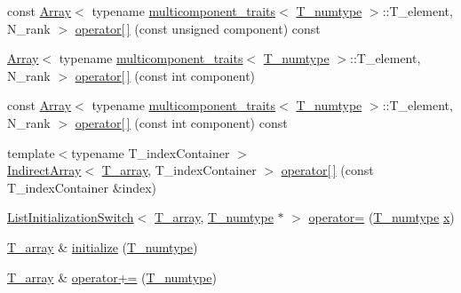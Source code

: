 \begin{DoxyCompactItemize}
\item 
const \hyperlink{classArray}{Array}$<$ typename \hyperlink{structmulticomponent__traits}{multicomponent\+\_\+traits}$<$ \hyperlink{classArray_ae72770f4a1d2f8b7193badafc320f008}{T\+\_\+numtype} $>$\+::T\+\_\+element, N\+\_\+rank $>$ \hyperlink{classArray_abddb0f84b164572b832a72fefcb7c6a3}{operator\mbox{[}$\,$\mbox{]}} (const unsigned component) const 
\item 
\hyperlink{classArray}{Array}$<$ typename \hyperlink{structmulticomponent__traits}{multicomponent\+\_\+traits}$<$ \hyperlink{classArray_ae72770f4a1d2f8b7193badafc320f008}{T\+\_\+numtype} $>$\+::T\+\_\+element, N\+\_\+rank $>$ \hyperlink{classArray_acca3c1802edac60f8482419c9902d28f}{operator\mbox{[}$\,$\mbox{]}} (const int component)
\item 
const \hyperlink{classArray}{Array}$<$ typename \hyperlink{structmulticomponent__traits}{multicomponent\+\_\+traits}$<$ \hyperlink{classArray_ae72770f4a1d2f8b7193badafc320f008}{T\+\_\+numtype} $>$\+::T\+\_\+element, N\+\_\+rank $>$ \hyperlink{classArray_a6deb6b01a7a7ac0ef1b5d4f63368354b}{operator\mbox{[}$\,$\mbox{]}} (const int component) const 
\item 
{\footnotesize template$<$typename T\+\_\+index\+Container $>$ }\\\hyperlink{classIndirectArray}{Indirect\+Array}$<$ \hyperlink{classArray_a6a3d9b6a214107a10df219091801f1e0}{T\+\_\+array}, T\+\_\+index\+Container $>$ \hyperlink{classArray_ae97dbb0539c62745cb96ba2c3476cc69}{operator\mbox{[}$\,$\mbox{]}} (const T\+\_\+index\+Container \&index)
\item 
\hyperlink{classListInitializationSwitch}{List\+Initialization\+Switch}$<$ \hyperlink{classArray_a6a3d9b6a214107a10df219091801f1e0}{T\+\_\+array}, \hyperlink{classArray_ae72770f4a1d2f8b7193badafc320f008}{T\+\_\+numtype} $\ast$ $>$ \hyperlink{classArray_ae856960044c0f8c560afbb03c9f9dbb8}{operator=} (\hyperlink{classArray_ae72770f4a1d2f8b7193badafc320f008}{T\+\_\+numtype} \hyperlink{vecnorm1_8cc_ac73eed9e41ec09d58f112f06c2d6cb63}{x})
\item 
\hyperlink{classArray_a6a3d9b6a214107a10df219091801f1e0}{T\+\_\+array} \& \hyperlink{classArray_af360b8224a87c1c01e77e2a783748cea}{initialize} (\hyperlink{classArray_ae72770f4a1d2f8b7193badafc320f008}{T\+\_\+numtype})
\item 
\hyperlink{classArray_a6a3d9b6a214107a10df219091801f1e0}{T\+\_\+array} \& \hyperlink{classArray_a7286ad36259661a36233ba93a305c6b5}{operator+=} (\hyperlink{classArray_ae72770f4a1d2f8b7193badafc320f008}{T\+\_\+numtype})

\end{DoxyCompactItemize}
